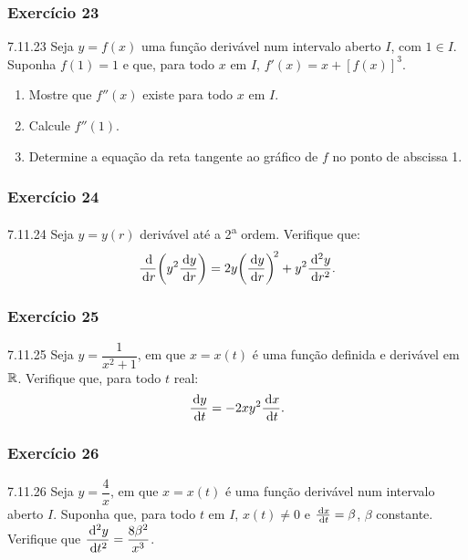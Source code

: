 \subsubsection*{Exercício 23}
\begin{exercicio}[23]{7.11.23}
Seja $y = f(x)$ uma função derivável num intervalo aberto $I$, com $1 \in I$. Suponha $f(1) = 1$ e que, para todo $x$ em $I$, $f'(x) = x + [f(x)]^3$.
\begin{enumerate}[label=\alph*)]
    \item Mostre que $f''(x)$ existe para todo $x$ em $I$.
    \item Calcule $f''(1)$.
    \item Determine a equação da reta tangente ao gráfico de $f$ no ponto de abscissa 1.
\end{enumerate}
\end{exercicio}

\subsubsection*{Exercício 24}
\begin{exercicio}[24]{7.11.24}
Seja $y = y(r)$ derivável até a 2\textsuperscript{a} ordem. Verifique que:
\[
\frac{\,\mathrm{d}}{\,\mathrm{d} r}\!\left(y^2 \frac{\,\mathrm{d} y}{\,\mathrm{d} r}\right) = 2y\!\left(\frac{\,\mathrm{d} y}{\,\mathrm{d} r}\right)^{\!2} + y^2 \frac{\,\mathrm{d}^2 y}{\,\mathrm{d} r^2}.
\]
\end{exercicio}

\subsubsection*{Exercício 25}
\begin{exercicio}[25]{7.11.25}
Seja $y = \dfrac{1}{x^2 + 1}$, em que $x = x(t)$ é uma função definida e derivável em $\mathbb{R}$. Verifique que, para todo $t$ real:
\[
\frac{\,\mathrm{d} y}{\,\mathrm{d} t} = -2xy^2 \frac{\,\mathrm{d} x}{\,\mathrm{d} t}.
\]
\end{exercicio}

\subsubsection*{Exercício 26}
\begin{exercicio}[26]{7.11.26}
Seja $y = \dfrac{4}{x}$, em que $x = x(t)$ é uma função derivável num intervalo aberto $I$. Suponha que, para todo $t$ em $I$, $x(t) \neq 0$ e $\frac{\,\mathrm{d} x}{\,\mathrm{d} t} = \beta$, $\beta$ constante. Verifique que $\dfrac{\,\mathrm{d}^2 y}{\,\mathrm{d} t^2} = \dfrac{8\beta^2}{x^3}$.
\end{exercicio}

